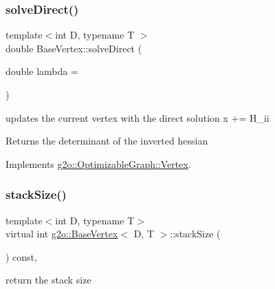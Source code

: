 \mbox{\label{classg2o_1_1_base_vertex_a0bbd9551b7e03f7e422169e396e8ec9b}} 
\subsubsection{\texorpdfstring{solve\+Direct()}{solveDirect()}}
{\footnotesize\ttfamily template$<$int D, typename T $>$ \\
double Base\+Vertex\+::solve\+Direct (\begin{DoxyParamCaption}\item[{double}]{lambda = {} }\end{DoxyParamCaption})\hspace{0.3cm}{\ttfamily [virtual]}}

updates the current vertex with the direct solution x += H\+\_\+ii \begin{DoxyReturn}{Returns}
the determinant of the inverted hessian 
\end{DoxyReturn}


Implements \mbox{\hyperlink{classg2o_1_1_optimizable_graph_1_1_vertex_a61c4e7b7a7a61e1f287069a8cb01004f}{g2o\+::\+Optimizable\+Graph\+::\+Vertex}}.

\mbox{\label{classg2o_1_1_base_vertex_a7d82f4b9669dd123ac7d38c7f4345d8c}} 
\subsubsection{\texorpdfstring{stack\+Size()}{stackSize()}}
{\footnotesize\ttfamily template$<$int D, typename T$>$ \\
virtual int \mbox{\hyperlink{classg2o_1_1_base_vertex}{g2o\+::\+Base\+Vertex}}$<$ D, T $>$\+::stack\+Size (\begin{DoxyParamCaption}{ }\end{DoxyParamCaption}) const\hspace{0.3cm}{\ttfamily [inline]}, {\ttfamily [virtual]}}



return the stack size 




